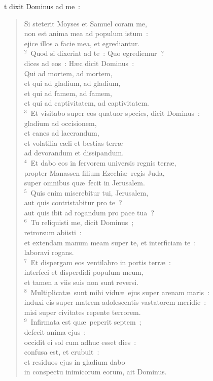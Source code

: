 \bchapter
{}t dixit Dominus ad me~: \begin{verse}Si steterit Moyses et Samuel coram me,\\ non est anima mea ad populum istum~:\\ ejice illos a facie mea, et egrediantur.\\
${}^{2}$~Quod si dixerint ad te~: Quo egrediemur~?\\ dices ad eos~: H\ae c dicit Dominus~:\\ Qui ad mortem, ad mortem,\\ et qui ad gladium, ad gladium,\\ et qui ad famem, ad famem,\\ et qui ad captivitatem, ad captivitatem.\\
${}^{3}$~Et visitabo super eos quatuor species, dicit Dominus~:\\ gladium ad occisionem,\\ et canes ad lacerandum,\\ et volatilia c\ae li et bestias terr\ae \\ ad devorandum et dissipandum.\\
${}^{4}$~Et dabo eos in fervorem universis regnis terr\ae ,\\ propter Manassen filium Ezechi\ae\ regis Juda,\\ super omnibus qu\ae\ fecit in Jerusalem.\\
${}^{5}$~Quis enim miserebitur tui, Jerusalem,\\ aut quis contristabitur pro te~?\\ aut quis ibit ad rogandum pro pace tua~?\\
${}^{6}$~Tu reliquisti me, dicit Dominus~;\\ retrorsum abiisti~:\\ et extendam manum meam super te, et interficiam te~:\\ laboravi rogans.\\
${}^{7}$~Et dispergam eos ventilabro in portis terr\ae~:\\ interfeci et disperdidi populum meum,\\ et tamen a viis suis non sunt reversi.\\
${}^{8}$~Multiplicat\ae\ sunt mihi vidu\ae\ ejus super arenam maris~:\\ induxi eis super matrem adolescentis vastatorem meridie~:\\ misi super civitates repente terrorem.\\
${}^{9}$~Infirmata est qu\ae\ peperit septem~;\\ defecit anima ejus~:\\ occidit ei sol cum adhuc esset dies~:\\ confusa est, et erubuit~:\\ et residuos ejus in gladium dabo\\ in conspectu inimicorum eorum, ait Dominus.\end{verse}


